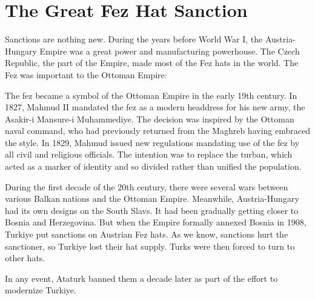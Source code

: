 \section{The Great Fez Hat Sanction}

Sanctions are nothing new. During the years before World War I, the Austria-Hungary Empire was a great power and manufacturing powerhouse. The Czech Republic, the part of the Empire, made most of the Fez hats in the world. The Fez was important to the Ottoman Empire:

\begin{quotex}
The fez became a symbol of the Ottoman Empire in the early 19th century. In 1827, Mahmud II mandated the fez as a modern headdress for his new army, the Asakir-i Mansure-i Muhammediye. The decision was inspired by the Ottoman naval command, who had previously returned from the Maghreb having embraced the style. In 1829, Mahmud issued new regulations mandating use of the fez by all civil and religious officials. The intention was to replace the turban, which acted as a marker of identity and so divided rather than unified the population.
\end{quotex}


During the first decade of the 20th century, there were several wars between various Balkan nations and the Ottoman Empire. Meanwhile, Austria-Hungary had its own designs on the South Slavs. It had been gradually getting closer to Bosnia and Herzegovina. But when the Empire formally annexed Bosnia in 1908, Turkiye put sanctions on Austrian Fez hats. As we know, sanctions hurt the sanctioner, so Turkiye lost their hat supply. Turks were then forced to turn to other hats.

In any event, Ataturk banned them a decade later as part of the effort to modernize Turkiye.



